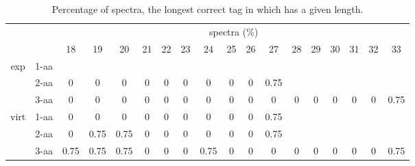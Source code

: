 \documentclass{article}
\begin{document}
\begin{table}[h]\tiny
\vspace{3mm}
{\centering
\begin{center}
\begin{tabular}{|c|l|c|c|c|c|c|c|c|c|c|c|c|c|c|c|c|c|}
  \hline
  \multicolumn{2}{|c|}{ } & \multicolumn{ 16 }{|c|}{ spectra (\%)} \\
  \cline{3- 18}
  \multicolumn{2}{|c|}{ }  & 18 & 19 & 20 & 21 & 22 & 23 & 24 & 25 & 26 & 27 & 28 & 29 & 30 & 31 & 32 & 33\\
  \hline
  \multirow{3}{*}{exp}
&  1-aa  &  &  &  &  &  &  &  &  &  &  &  &  &  &  &  & \\&  2-aa  & 0 & 0 & 0 & 0 & 0 & 0 & 0 & 0 & 0 & 0.75 &  &  &  &  &  & \\&  3-aa  & 0 & 0 & 0 & 0 & 0 & 0 & 0 & 0 & 0 & 0 & 0 & 0 & 0 & 0 & 0 & 0.75\\ \hline
  \multirow{3}{*}{virt} 
&  1-aa  & 0 & 0 & 0 & 0 & 0 & 0 & 0 & 0 & 0 & 0.75 &  &  &  &  &  & \\&  2-aa  & 0 & 0.75 & 0.75 & 0 & 0 & 0 & 0 & 0 & 0 & 0.75 &  &  &  &  &  & \\&  3-aa  & 0.75 & 0.75 & 0.75 & 0 & 0 & 0 & 0.75 & 0 & 0 & 0 & 0 & 0 & 0 & 0 & 0 & 0.75\\ \hline
\end{tabular}
\end{center}
\par}
\centering
\caption{ Percentage of spectra, the longest correct tag in which has a given length.}
\vspace{3mm}
\label{table:table4}
\end{table}
\end{document}
